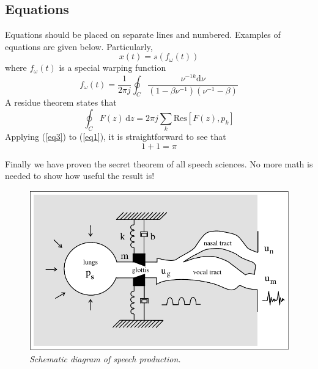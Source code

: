 \documentclass[a4paper]{article}
\begin{document}
  
    \subsection{Equations}

      Equations should be placed on separate lines and numbered. 
      Examples of equations are given below.
      Particularly,
      \begin{equation}
        x(t) = s(f_\omega(t))
        \label{eq1}
      \end{equation}
      where \(f_\omega(t)\) is a special warping function
      \begin{equation}
        f_\omega(t) = \frac{1}{2 \pi j} \oint_C 
        \frac{\nu^{-1k} \mathrm{d} \nu}
             {(1-\beta\nu^{-1})(\nu^{-1}-\beta)}
        \label{eq2}
      \end{equation}
      A residue theorem states that
      \begin{equation}
        \oint_C F(z)\,\mathrm{d}z = 2 \pi j \sum_k \mathrm{Res}[F(z),p_k]
        \label{eq3}
      \end{equation}
      Applying (\ref{eq3}) to (\ref{eq1}), it is straightforward to see that
      \begin{equation}
        1 + 1 = \pi
        \label{eq4}
      \end{equation}

      Finally we have proven the secret theorem of all speech sciences.
      No more math is needed to show how useful the result is!

      \begin{figure}[t]
        \centering
        \includegraphics[width=\linewidth]{figure.pdf}
        \caption{{\it Schematic diagram of speech production.}}
        \label{fig:speech_production}
      \end{figure}
  
\end{document}
